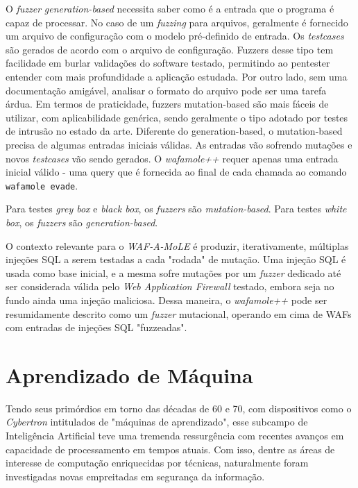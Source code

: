 O \textit{fuzzer} \textit{generation-based} necessita saber como é a entrada que o programa é capaz de processar. No caso de um \textit{fuzzing} para arquivos, geralmente é fornecido um arquivo de configuração com o modelo pré-definido de entrada. Os \textit{testcases} são gerados de acordo com o arquivo de configuração. Fuzzers desse tipo tem facilidade em burlar validações do software testado, permitindo ao pentester entender com mais profundidade a aplicação estudada. Por outro lado, sem uma documentação amigável, analisar o formato do arquivo pode ser uma tarefa árdua.
Em termos de praticidade, fuzzers mutation-based são mais fáceis de utilizar, com aplicabilidade genérica, sendo geralmente o tipo adotado por testes de intrusão no estado da arte. Diferente do generation-based, o mutation-based precisa de algumas entradas iniciais válidas. As entradas vão sofrendo mutações e novos \textit{testcases} vão sendo gerados. O \textit{wafamole++} requer apenas uma entrada inicial válido - uma query que é fornecida ao final de cada chamada ao comando \verb+wafamole evade+.

Para testes \textit{grey box} e \textit{black box}, os \textit{fuzzers} são \textit{mutation-based}. Para testes \textit{white box}, os \textit{fuzzers} são \textit{generation-based}.

O contexto relevante para o \textit{WAF-A-MoLE} é produzir, iterativamente, múltiplas injeções SQL a serem testadas a cada "rodada" de mutação. Uma injeção SQL é usada como base inicial, e a mesma sofre mutações por um \textit{fuzzer} dedicado até ser considerada válida pelo \textit{Web Application Firewall} testado, embora seja no fundo ainda uma injeção maliciosa. Dessa maneira, o \textit{wafamole++} pode ser resumidamente descrito como um \textit{fuzzer} mutacional, operando em cima de WAFs com entradas de injeções SQL "fuzzeadas".

\section{Aprendizado de Máquina}

Tendo seus primórdios em torno das décadas de 60 e 70, com dispositivos como o \textit{Cybertron} intitulados de "máquinas de aprendizado", esse subcampo de Inteligência Artificial teve uma tremenda ressurgência com recentes avanços em capacidade de processamento em tempos atuais. Com isso, dentre as áreas de interesse de computação enriquecidas por técnicas, naturalmente foram investigadas novas empreitadas em segurança da informação.

